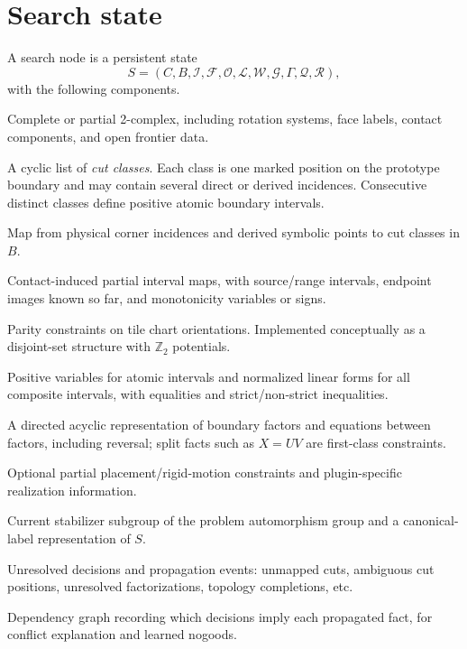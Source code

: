 \documentclass[11pt]{article}
\begin{document}
\section{Search state}
\label{sec:state}

A search node is a persistent state
\[
S=(C,B,\mathcal I,\mathcal F,\mathcal O,\mathcal L,\mathcal W,\mathcal G,\Gamma,\mathcal Q,\mathcal R),
\]
with the following components.

\begin{description}[leftmargin=3.6cm,style=nextline]
  \item[$C$ -- patch complex] Complete or partial 2-complex, including rotation systems, face labels, contact components, and open frontier data.
  \item[$B$ -- boundary partition] A cyclic list of \emph{cut classes}.  Each class is one marked position on the prototype boundary and may contain several direct or derived incidences.  Consecutive distinct classes define positive atomic boundary intervals.
  \item[$\mathcal I$ -- incidences] Map from physical corner incidences and derived symbolic points to cut classes in $B$.
  \item[$\mathcal F$ -- partial maps] Contact-induced partial interval maps, with source/range intervals, endpoint images known so far, and monotonicity variables or signs.
  \item[$\mathcal O$ -- orientation system] Parity constraints on tile chart orientations.  Implemented conceptually as a disjoint-set structure with $\mathbb Z_2$ potentials.
  \item[$\mathcal L$ -- length theory] Positive variables for atomic intervals and normalized linear forms for all composite intervals, with equalities and strict/non-strict inequalities.
  \item[$\mathcal W$ -- word theory] A directed acyclic representation of boundary factors and equations between factors, including reversal; split facts such as $X=UV$ are first-class constraints.
  \item[$\mathcal G$ -- geometry theory] Optional partial placement/rigid-motion constraints and plugin-specific realization information.
  \item[$\Gamma$ -- symmetry state] Current stabilizer subgroup of the problem automorphism group and a canonical-label representation of $S$.
  \item[$\mathcal Q$ -- obligation queue] Unresolved decisions and propagation events: unmapped cuts, ambiguous cut positions, unresolved factorizations, topology completions, etc.
  \item[$\mathcal R$ -- reasons] Dependency graph recording which decisions imply each propagated fact, for conflict explanation and learned nogoods.
\end{description}
\end{document}
